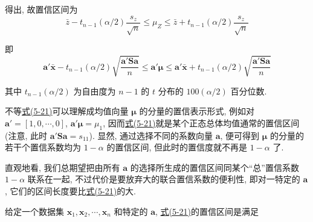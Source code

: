 得出, 故置信区间为
\[
\bar{z}-t_{n-1}(\alpha/2)\frac{s_{z}}{\sqrt{n}}\le \mu_{Z}\le \bar{z}+t_{n-1}(\alpha/2)\frac{s_{z}}{\sqrt{n}}
\]

即
\label{eq:5-21}
\begin{equation}
\mathbf{a}'\bar{\mathbf{x}}-t_{n-1}(\alpha/2)\sqrt{\frac{\mathbf{a}'\mathbf{S}\mathbf{a}}{n}}\le \mathbf{a}'\boldsymbol{\mu}\le \mathbf{a}'\bar{\mathbf{x}}+t_{n-1}(\alpha/2)\sqrt{\frac{\mathbf{a}'\mathbf{S}\mathbf{a}}{n}} \tag{5-21}
\end{equation}

其中 $t_{n-1}(\alpha/2)$ 为自由度为 $n-1$ 的 $t$ 分布的 $100(\alpha/2)$ 百分位数.

不等\hyperref[eq:5-21]{式(5-21)}可以理解成均值向量 $\boldsymbol{\mu}$ 的分量的置信表示形式, 例如对 $\mathbf{a}'=[1,0,\cdots,0]$, $\mathbf{a}'\boldsymbol{\mu}=\mu_{1}$, 因而\hyperref[eq:5-21]{式(5-21)}就是某个正态总体均值通常的置信区间(注意, 此时 $\mathbf{a}'\mathbf{S}\mathbf{a}=s_{11}$). 显然, 通过选择不同的系数向量 $\mathbf{a}$, 便可得到 $\boldsymbol{\mu}$ 的分量的若干个置信系数均为 $1-\alpha$ 的置信区间, 但此时的置信度就不再是 $1-\alpha$ 了.

直观地看, 我们总期望把由所有 $\mathbf{a}$ 的选择所生成的置信区间同某个“总”置信系数 $1-\alpha$ 联系在一起, 不过代价是要放弃大的联合置信系数的便利性, 即对一特定的 $\mathbf{a}$, 它们的区间长度要比\hyperref[eq:5-21]{式(5-21)}的大.

给定一个数据集 $\mathbf{x}_{1},\mathbf{x}_{2},\cdots,\mathbf{x}_{n}$ 和特定的 $\mathbf{a}$, \hyperref[eq:5-21]{式(5-21)}的置信区间是满足
